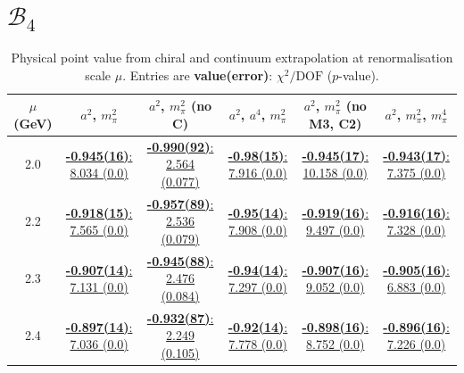 \documentclass[12pt]{extarticle}
\begin{document}
\section{$\mathcal{B}_4$}
\begin{table}[h!]
\begin{center}
\begin{tabular}{|c|c|c|c|c|c|}
\hline
$\mu$ (GeV) & $a^2$, $m_\pi^2$& $a^2$, $m_\pi^2$ (no C)& $a^2$, $a^4$, $m_\pi^2$& $a^2$, $m_\pi^2$ (no M3, C2)& $a^2$, $m_\pi^2$, $m_\pi^4$\\
\hline
2.0& \hyperlink{SSpPP/NPR/a2m2_20.pdf.1}{\textbf{-0.945(16)}: 8.034 (0.0)} & \hyperlink{SSpPP/NPR/a2m2noC_20.pdf.1}{\textbf{-0.990(92)}: 2.564 (0.077)} & \hyperlink{SSpPP/NPR/a2a4m2_20.pdf.1}{\textbf{-0.98(15)}: 7.916 (0.0)} & \hyperlink{SSpPP/NPR/a2m2mcut_20.pdf.1}{\textbf{-0.945(17)}: 10.158 (0.0)} & \hyperlink{SSpPP/NPR/a2m2m4_20.pdf.1}{\textbf{-0.943(17)}: 7.375 (0.0)}\\
2.2& \hyperlink{SSpPP/NPR/a2m2_22.pdf.1}{\textbf{-0.918(15)}: 7.565 (0.0)} & \hyperlink{SSpPP/NPR/a2m2noC_22.pdf.1}{\textbf{-0.957(89)}: 2.536 (0.079)} & \hyperlink{SSpPP/NPR/a2a4m2_22.pdf.1}{\textbf{-0.95(14)}: 7.908 (0.0)} & \hyperlink{SSpPP/NPR/a2m2mcut_22.pdf.1}{\textbf{-0.919(16)}: 9.497 (0.0)} & \hyperlink{SSpPP/NPR/a2m2m4_22.pdf.1}{\textbf{-0.916(16)}: 7.328 (0.0)}\\
2.3& \hyperlink{SSpPP/NPR/a2m2_23.pdf.1}{\textbf{-0.907(14)}: 7.131 (0.0)} & \hyperlink{SSpPP/NPR/a2m2noC_23.pdf.1}{\textbf{-0.945(88)}: 2.476 (0.084)} & \hyperlink{SSpPP/NPR/a2a4m2_23.pdf.1}{\textbf{-0.94(14)}: 7.297 (0.0)} & \hyperlink{SSpPP/NPR/a2m2mcut_23.pdf.1}{\textbf{-0.907(16)}: 9.052 (0.0)} & \hyperlink{SSpPP/NPR/a2m2m4_23.pdf.1}{\textbf{-0.905(16)}: 6.883 (0.0)}\\
2.4& \hyperlink{SSpPP/NPR/a2m2_24.pdf.1}{\textbf{-0.897(14)}: 7.036 (0.0)} & \hyperlink{SSpPP/NPR/a2m2noC_24.pdf.1}{\textbf{-0.932(87)}: 2.249 (0.105)} & \hyperlink{SSpPP/NPR/a2a4m2_24.pdf.1}{\textbf{-0.92(14)}: 7.778 (0.0)} & \hyperlink{SSpPP/NPR/a2m2mcut_24.pdf.1}{\textbf{-0.898(16)}: 8.752 (0.0)} & \hyperlink{SSpPP/NPR/a2m2m4_24.pdf.1}{\textbf{-0.896(16)}: 7.226 (0.0)}\\
\hline
\end{tabular}
\caption{Physical point value from chiral and continuum extrapolation at renormalisation scale $\mu$. Entries are \textbf{value(error)}: $\chi^2/\text{DOF}$ ($p$-value).}
\end{center}
\end{table}
\end{document}
